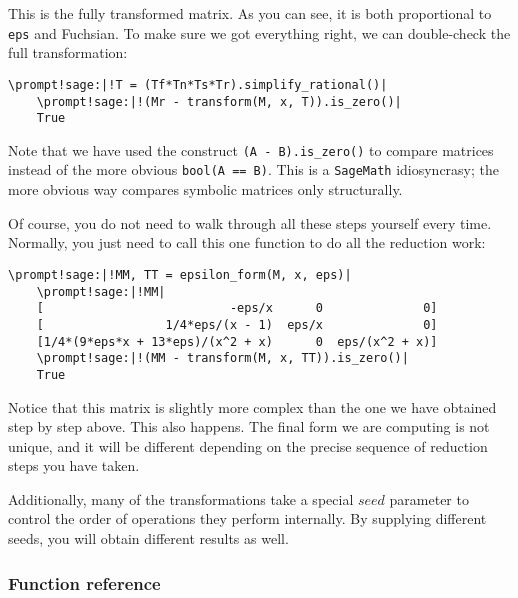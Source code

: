\documentclass{elsarticle}
\newcommand{\sage}{\texttt{SageMath}\xspace}
\newcommand{\code}[1]{\texttt{#1}}
\newcommand{\prompt}[2]{\textcolor{prompt}{#1} \textcolor{command}{#2}}
\begin{document}
This is the fully transformed matrix.
As you can see, it is both proportional to \code{eps} and Fuchsian.
To make sure we got everything right, we can double-check the full transformation:

\begin{Verbatim}[commandchars=\\!|]
    \prompt!sage:|!T = (Tf*Tn*Ts*Tr).simplify_rational()|
    \prompt!sage:|!(Mr - transform(M, x, T)).is_zero()|
    True
\end{Verbatim}

Note that we have used the construct \code{(A - B).is\_zero()} to compare matrices instead of the more obvious \code{bool(A == B)}.
This is a \sage idiosyncrasy; the more obvious way compares symbolic matrices only structurally.

Of course, you do not need to walk through all these steps yourself every time.
Normally, you just need to call this one function to do all the reduction work:

\begin{Verbatim}[commandchars=\\!|]
    \prompt!sage:|!MM, TT = epsilon_form(M, x, eps)|
    \prompt!sage:|!MM|
    [                          -eps/x      0              0]
    [                 1/4*eps/(x - 1)  eps/x              0]
    [1/4*(9*eps*x + 13*eps)/(x^2 + x)      0  eps/(x^2 + x)]
    \prompt!sage:|!(MM - transform(M, x, TT)).is_zero()|
    True
\end{Verbatim}

Notice that this matrix is slightly more complex than the one we have obtained step by step above.
This also happens.
The final form we are computing is not unique, and it will be different depending on the precise sequence of reduction steps you have taken.

Additionally, many of the transformations take a special $seed$ parameter to control the order of operations they perform internally.
By supplying different seeds, you will obtain different results as well.

\subsubsection{Function reference}
\end{document}
